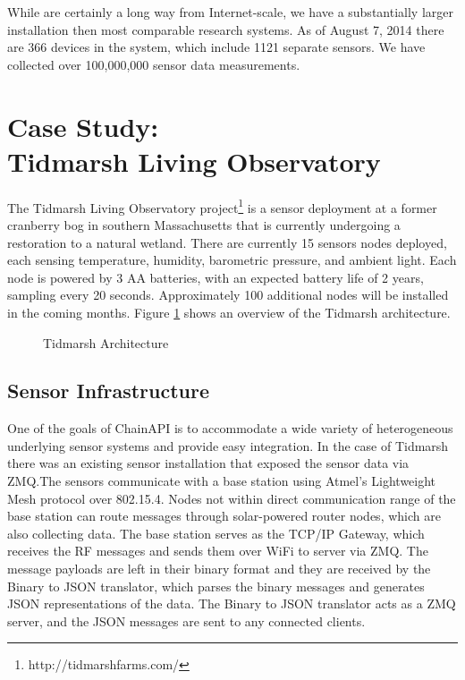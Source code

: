 \documentclass{acm_proc_article-sp}
\begin{document}
While are certainly a long way from Internet-scale, we have a substantially
larger installation then most comparable research systems. As of August 7, 2014
there are 366 devices in the system, which include 1121 separate sensors. We
have collected over 100,000,000 sensor data measurements.

\section{Case Study:\\Tidmarsh Living Observatory}

The Tidmarsh Living Observatory project\footnote{http://tidmarshfarms.com/} is
a sensor deployment at a former cranberry bog in southern Massachusetts that is
currently undergoing a restoration to a natural wetland. There are currently 15
sensors nodes deployed, each sensing temperature, humidity, barometric
pressure, and ambient light. Each node is powered by 3 AA batteries, with an
expected battery life of 2 years, sampling every 20 seconds. Approximately 100
additional nodes will be installed in the coming months. Figure
\ref{tidmarsh_arch} shows an overview of the Tidmarsh architecture.

\begin{figure}
    \centering
    
    \caption{Tidmarsh Architecture}
    \label{tidmarsh_arch}
\end{figure}

\subsection{Sensor Infrastructure}

One of the goals of ChainAPI is to accommodate a wide variety of heterogeneous
underlying sensor systems and provide easy integration. In the case of Tidmarsh
there was an existing sensor installation that exposed the sensor data via
ZMQ.The sensors communicate with a base station
using Atmel's Lightweight Mesh protocol over 802.15.4. Nodes not within direct
communication range of the base station can route messages through
solar-powered router nodes, which are also collecting data. The base station
serves as the TCP/IP Gateway, which receives the RF messages and sends them
over WiFi to server via ZMQ. The message payloads are left in their binary
format and they are received by the Binary to JSON translator, which parses the
binary messages and generates JSON representations of the data. The Binary to
JSON translator acts as a ZMQ server, and the JSON messages are sent to any
connected clients.
\end{document}

